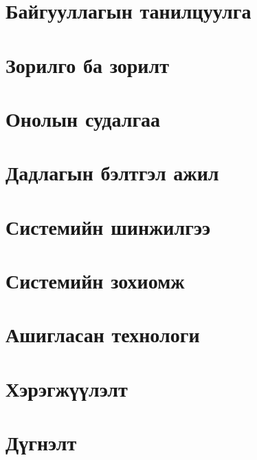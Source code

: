 
\chapter{Байгууллагын танилцуулга}


\chapter{Зорилго ба зорилт}


\chapter{Онолын судалгаа}


\chapter{Дадлагын бэлтгэл ажил}


\chapter{Системийн шинжилгээ}


\chapter{Системийн зохиомж}


\chapter{Ашигласан технологи}


\chapter{Хэрэгжүүлэлт}


\chapter{Дүгнэлт}
